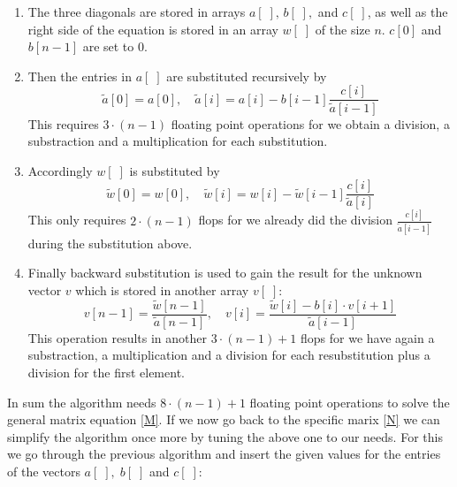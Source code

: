 \documentclass[11pt,a4wide]{article}
\begin{document}
\begin{enumerate}
	\item  The three diagonals are stored in arrays $a[\;],\,b[\;],$ and $c[\;]$, as well as the right side of the equation is stored in an array $w[\;]$ of the size $n$. $c[0]$ and $b[n-1]$ are set to 0.
	\item	Then the entries in $a[\;]$ are substituted recursively by
	\begin{equation}
	\tilde{a}[0]=a[0],\quad \tilde{a}[i]=a[i]-b[i-1]\dfrac{c[i]}{\tilde{a}[i-1]}
	\label{eq:3}
	\end{equation}
	This requires $3\cdot (n-1)$ floating point operations for we obtain a division, a substraction and a multiplication for each substitution.
	\item Accordingly $w[\;]$ is substituted by
		\begin{equation}
	\tilde{w}[0]=w[0],\quad \tilde{w}[i]=w[i]-\tilde{w}[i-1]\dfrac{c[i]}{\tilde{a}[i]}
	\label{eq:4}
	\end{equation}
	This only requires $2\cdot (n-1)$ flops for we already did the division $\frac{c[i]}{\tilde{a}[i-1]}$ during the substitution above.
	\item Finally backward substitution is used to gain the result for the unknown vector $v$ which is stored in another array $v[\;]$:
		\begin{equation}
	v[n-1]=\dfrac{\tilde{w}[n-1]}{\tilde{a}[n-1]},\quad v[i]=\dfrac{\tilde{w}[i]-b[i]\cdot v[i+1]}{\tilde{a}[i-1]}
	\label{eq:5}
	\end{equation}
	This operation results in another $3\cdot(n-1)+1$ flops for we have again a substraction, a multiplication and a division for each resubstitution plus a division for the first element.
\end{enumerate}
In sum the algorithm needs $8\cdot(n-1)+1$ floating point operations to solve the general matrix equation \ref{M}. 
If we now go back to the specific marix \ref{N} we can simplify the algorithm once more by tuning the above one to our needs.  For this we go through the previous algorithm and insert the given values for the entries of the vectors $a[\;],\;b[\;]$ and $c[\;]$:
\end{document}
